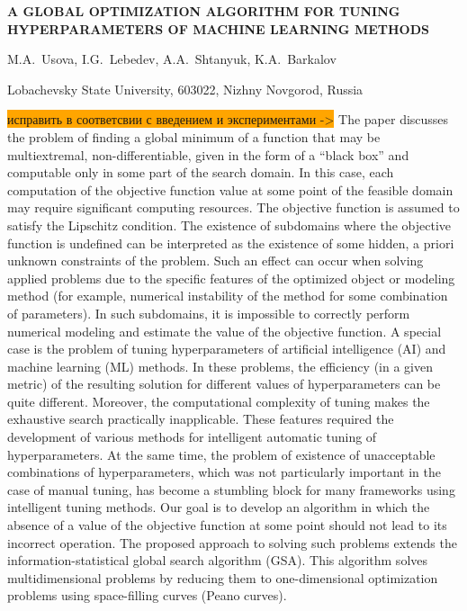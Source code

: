 \documentclass[a4paper,12pt,russian]{article}
\begin{document}
\begin{center}
	\textbf{A GLOBAL OPTIMIZATION ALGORITHM FOR \break
    TUNING HYPERPARAMETERS OF MACHINE LEARNING METHODS} 
\end{center}

\begin{center}
{M.A.~Usova, I.G.~Lebedev, A.A.~Shtanyuk, K.A.~Barkalov}
\end{center}

\begin{center}
{Lobachevsky State University, 603022, Nizhny Novgorod, Russia}
\end{center}
\begin{small}

\colorbox{orange}{исправить в соответсвии с введением и экспериментами ->}
The paper discusses the problem of finding a global minimum of a function that may be multiextremal, non-differentiable, given in the form of a ``black box'' and computable only in some part of the search domain. In this case, each computation of the objective function value at some point of the feasible domain may require significant computing resources. The objective function is assumed to satisfy the Lipschitz condition.
The existence of subdomains where the objective function is undefined can be interpreted as the existence of some hidden, a priori unknown constraints of the problem. Such an effect can occur when solving applied problems due to the specific features of the optimized object or modeling method (for example, numerical instability of the method for some combination of parameters). In such subdomains, it is impossible to correctly perform numerical modeling and estimate the value of the objective function. A special case is the problem of tuning hyperparameters of artificial intelligence (AI) and machine learning (ML) methods. In these problems, the efficiency (in a given metric) of the resulting solution for different values of hyperparameters can be quite different. Moreover, the computational complexity of tuning makes the exhaustive search practically inapplicable. These features required the development of various methods for intelligent automatic tuning of hyperparameters. At the same time, the problem of existence of unacceptable combinations of hyperparameters, which was not particularly important in the case of manual tuning, has become a stumbling block for many frameworks using intelligent tuning methods.
Our goal is to develop an algorithm in which the absence of a value of the objective function at some point should not lead to its incorrect operation. The proposed approach to solving such problems extends the information-statistical global search algorithm (GSA). This algorithm solves multidimensional problems by reducing them to one-dimensional optimization problems using space-filling curves (Peano curves).

\end{small}
\end{document}
